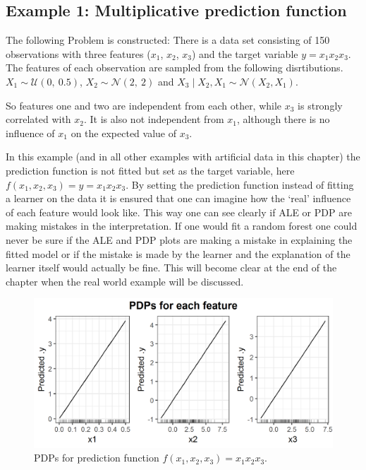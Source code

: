 \documentclass[
]{krantz}
\begin{document}
\hypertarget{example-1-multiplicative-prediction-function}{%
\subsection{Example 1: Multiplicative prediction function}\label{example-1-multiplicative-prediction-function}}

The following Problem is constructed: There is a data set consisting of 150 observations with three features (\(x_1\), \(x_2\), \(x_3\)) and the target variable \(y = x_1 x_2 x_3\).
The features of each observation are sampled from the following disrtibutions.
\(X_1 \sim \mathcal{U}(0,~0.5)\), \(X_2 \sim \mathcal{N}(2,~2)\) and \(X_3\mid X_2, X_1 \sim \mathcal{N}(X_2,X_1)\).

So features one and two are independent from each other, while \(x_3\) is strongly correlated with \(x_2\). It is also not independent from \(x_1\), although there is no influence of \(x_1\) on the expected value of \(x_3\).

In this example (and in all other examples with artificial data in this chapter) the prediction function is not fitted but set as the target variable, here \(f(x_1, x_2, x_3) = y = x_1 x_2 x_3\). By setting the prediction function instead of fitting a learner on the data it is ensured that one can imagine how the `real' influence of each feature would look like. This way one can see clearly if ALE or PDP are making mistakes in the interpretation. If one would fit a random forest one could never be sure if the ALE and PDP plots are making a mistake in explaining the fitted model or if the mistake is made by the learner and the explanation of the learner itself would actually be fine. This will become clear at the end of the chapter when the real world example will be discussed.

\begin{figure}
\includegraphics[width=1\linewidth]{images/ale_1_PDPs_x1x2x3_150_0_0p5_2_2} \caption{PDPs for prediction function \(f(x_1, x_2, x_3) = x_1 x_2 x_3\).}\label{fig:pdpsx1x2x3}
\end{figure}
\end{document}
